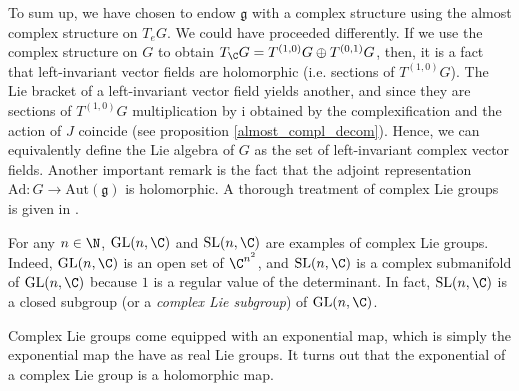 To sum up, we have chosen to endow \(\mathfrak{g}\) with a complex structure using the almost complex structure on \(T_eG\). We could have proceeded differently. If we use the complex structure on \(G\) to obtain \(T_\C G=T^{(1,0)}G \oplus T^{(0,1)}G \), then, it is a fact that left-invariant vector fields are holomorphic (i.e. sections of \(T^{(1,0)}G\)). The Lie bracket of a left-invariant vector field yields another, and since they are sections of \(T^{(1,0)}G\) multiplication by \(\mathrm{i}\) obtained by the complexification and the action of \(J\) coincide (see proposition \ref{almost_compl_decom}). Hence, we can equivalently define the Lie algebra of \(G\) as the set of left-invariant complex vector fields. Another important remark is the fact that the adjoint representation \(\mathrm{Ad}\colon G \to \mathrm{Aut}(\mathfrak{g})\) is holomorphic. A thorough treatment of complex Lie groups is given in \parencite{Lee_2002_complex_Lie}. 


\begin{example}
    For any \(n \in \N\), \(\mathrm{GL}(n, \C)\) and \(\mathrm{SL}(n, \C)\) are examples of complex Lie groups. Indeed, \(\mathrm{GL}(n,\C)\) is an open set of \(\C^{n^2}\), and \(\mathrm{SL}(n,\C)\) is a complex submanifold of \(\mathrm{GL}(n,\C)\) because \(1\) is a regular value of the determinant. In fact, \(\mathrm{SL}(n, \C)\) is a closed subgroup (or a \textit{complex Lie subgroup}) of \(\mathrm{GL}(n, \C)\). 
\end{example}

Complex Lie groups come equipped with an exponential map, which is simply the exponential map the have as real Lie groups. It turns out that the exponential of a complex Lie group is a holomorphic map. \\

